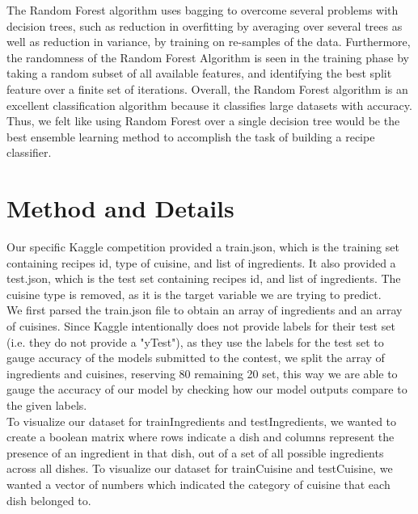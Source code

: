 \documentclass[11pt]{article}
\begin{document}
The Random Forest algorithm uses bagging to overcome several problems with decision
trees, such as reduction in overfitting by averaging over several trees as well
as reduction in variance, by training on re-samples of the data. Furthermore,
the randomness of the Random Forest Algorithm is seen in the training phase by taking a random subset
of all available features, and identifying the best split feature over a finite set
of iterations. Overall, the Random Forest algorithm is an excellent classification
algorithm because it classifies large datasets with accuracy.
Thus, we felt like using Random Forest over a single decision tree would be
the best ensemble learning method to accomplish the task of building a
recipe classifier. \\

\section{Method and Details}

Our specific Kaggle competition provided a train.json, which is the training
set containing recipes id, type of cuisine, and list of ingredients. It also
provided a test.json, which is the test set containing recipes id, and list of
ingredients. The cuisine type is removed, as it is the target variable we
are trying to predict. \\

We first parsed the train.json file to obtain an array of ingredients and an
array of cuisines. Since Kaggle intentionally does not provide labels for their test set (i.e. they
do not provide a "yTest"), as they use the labels for the test set to gauge
accuracy of the models submitted to the contest, we split the array of ingredients and cuisines,
reserving 80%
remaining 20%
set, this way we are able to gauge the accuracy of our model by checking how our model outputs
compare to the given labels. \\

To visualize our dataset for trainIngredients and testIngredients, we wanted to create a boolean matrix where rows indicate
a dish and columns represent the presence of an ingredient in that dish, out of
a set of all possible ingredients across all dishes. To visualize our dataset
for trainCuisine and testCuisine, we wanted a vector of numbers which indicated
the category of cuisine that each dish belonged to. \\
\end{document}
